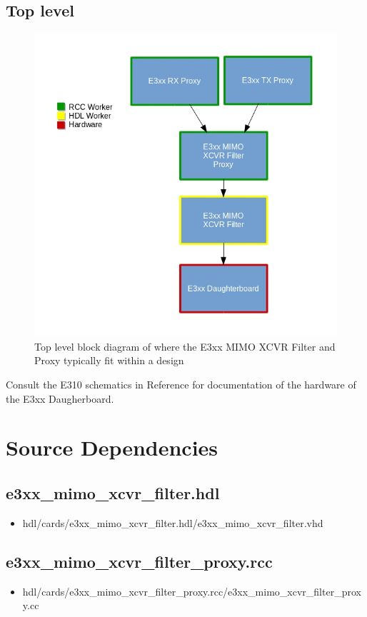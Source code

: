\documentclass{article}
\def\comp{e3xx\_mimo\_xcvr\_filter}
\def\proxy{e3xx\_mimo\_xcvr\_filter\_proxy}
\def\Comp{E3xx MIMO XCVR Filter and Proxy }
\begin{document}
\subsection*{Top level}
\begin{figure}[ht]
	\centerline{\includegraphics[scale=0.75]{e3xx_mimo_filter_top_level_diagram}}
	\caption{Top level block diagram of where the \Comp typically fit within a design}
	\label{fig:tb}
\end{figure}
\flushleft
Consult the E310 schematics in Reference \cite{schematics} for documentation of the hardware of the E3xx Daugherboard.
\section*{Source Dependencies}
\subsection*{\comp.hdl}
\begin{itemize}
	\item hdl/cards/\comp.hdl/\comp.vhd
\end{itemize}
\subsection*{\proxy.rcc}
\begin{itemize}
	\item hdl/cards/\proxy.rcc/\proxy.cc
\end{itemize}
\end{document}
